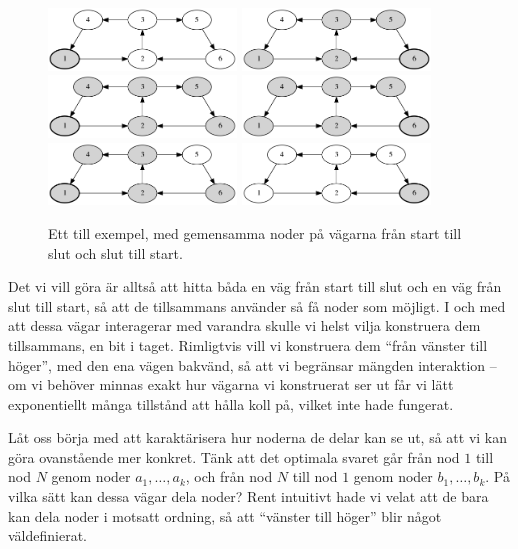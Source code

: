 \begin{figure}[!h]
\begin{center}
\includegraphics[width=5cm]{bstep1.png}
\includegraphics[width=5cm]{bstep2.png}
\includegraphics[width=5cm]{bstep3.png}
\includegraphics[width=5cm]{bstep4.png}
\includegraphics[width=5cm]{bstep5.png}
\includegraphics[width=5cm]{bstep6.png}
  \caption{Ett till exempel, med gemensamma noder på vägarna från start till slut och slut till start.}
\end{center}
\end{figure}

Det vi vill göra är alltså att hitta båda en väg från start till slut och en väg från slut till start, så att de tillsammans använder så få noder som möjligt.
I och med att dessa vägar interagerar med varandra skulle vi helst vilja konstruera dem tillsammans, en bit i taget.
Rimligtvis vill vi konstruera dem ``från vänster till höger'', med den ena vägen bakvänd, så att vi begränsar mängden interaktion --
om vi behöver minnas exakt hur vägarna vi konstruerat ser ut får vi lätt exponentiellt många tillstånd att hålla koll på, vilket inte hade fungerat.

Låt oss börja med att karaktärisera hur noderna de delar kan se ut, så att vi kan göra ovanstående mer konkret.
Tänk att det optimala svaret går från nod $1$ till nod $N$ genom noder $a_1, \dots, a_k$, och från nod $N$ till nod $1$ genom noder $b_1, \dots, b_k$.
På vilka sätt kan dessa vägar dela noder?
Rent intuitivt hade vi velat att de bara kan dela noder i motsatt ordning, så att ``vänster till höger'' blir något väldefinierat.

